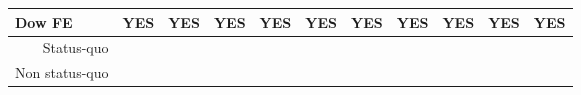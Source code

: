 \begin{tabular}{rrrrrrrrrrr}
\multicolumn{1}{l}{Dow FE} & \multicolumn{1}{c}{YES} & \multicolumn{1}{c}{YES} & \multicolumn{1}{c}{YES} & \multicolumn{1}{c}{YES} & \multicolumn{1}{c}{YES} & \multicolumn{1}{c}{YES} & \multicolumn{1}{c}{YES} & \multicolumn{1}{c}{YES} & \multicolumn{1}{c}{YES} & \multicolumn{1}{c}{YES} \\
\midrule
\midrule
\rowcolor[rgb]{ .929,  .929,  .929} Status-quo & \cellcolor[rgb]{ 1,  1,  1}  & \cellcolor[rgb]{ 1,  1,  1}  & \cellcolor[rgb]{ 1,  1,  1}  & \cellcolor[rgb]{ 1,  1,  1}  & \cellcolor[rgb]{ 1,  1,  1}  & \cellcolor[rgb]{ 1,  1,  1}  & \cellcolor[rgb]{ 1,  1,  1}  & \cellcolor[rgb]{ 1,  1,  1}  & \cellcolor[rgb]{ 1,  1,  1}  & \cellcolor[rgb]{ 1,  1,  1}  \\
\rowcolor[rgb]{ .859,  .859,  .859} Non status-quo & \cellcolor[rgb]{ 1,  1,  1}  & \cellcolor[rgb]{ 1,  1,  1}  & \cellcolor[rgb]{ 1,  1,  1}  & \cellcolor[rgb]{ 1,  1,  1}  & \cellcolor[rgb]{ 1,  1,  1}  & \cellcolor[rgb]{ 1,  1,  1}  & \cellcolor[rgb]{ 1,  1,  1}  & \cellcolor[rgb]{ 1,  1,  1}  & \cellcolor[rgb]{ 1,  1,  1}  & \cellcolor[rgb]{ 1,  1,  1}  \\
\end{tabular}%
